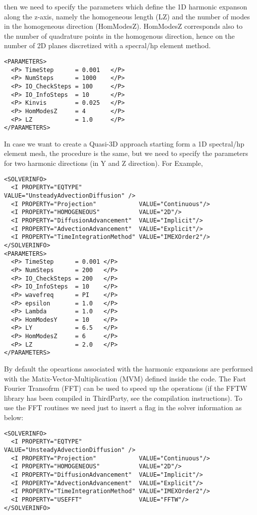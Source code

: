 then we need to specify the parameters which define the 1D harmonic expanson
along the z-axis, namely the homogeneous length (LZ) and the number of modes in
the homogeneous direction (HomModesZ). HomModesZ corresponds also to the number
of quadrature points in the homogenous direction, hence on the number of 2D
planes discretized with a specral/hp element method.

\begin{lstlisting}[style=XMLStyle]
<PARAMETERS>
  <P> TimeStep      = 0.001   </P>
  <P> NumSteps      = 1000    </P>
  <P> IO_CheckSteps = 100     </P>
  <P> IO_InfoSteps  = 10      </P>
  <P> Kinvis        = 0.025   </P>
  <P> HomModesZ     = 4       </P>
  <P> LZ            = 1.0     </P>
</PARAMETERS>
\end{lstlisting}

In case we want to create a Quasi-3D approach starting form a 1D spectral/hp
element mesh, the procedure is the same, but we need to specify the parameters
for two harmonic directions (in Y and Z direction). For Example,

\begin{lstlisting}[style=XMLStyle]
<SOLVERINFO>
  <I PROPERTY="EQTYPE"                VALUE="UnsteadyAdvectionDiffusion" />
  <I PROPERTY="Projection"            VALUE="Continuous"/>
  <I PROPERTY="HOMOGENEOUS"           VALUE="2D"/>
  <I PROPERTY="DiffusionAdvancement"  VALUE="Implicit"/>
  <I PROPERTY="AdvectionAdvancement"  VALUE="Explicit"/>
  <I PROPERTY="TimeIntegrationMethod" VALUE="IMEXOrder2"/>
</SOLVERINFO>
<PARAMETERS>
  <P> TimeStep      = 0.001 </P>
  <P> NumSteps      = 200   </P>
  <P> IO_CheckSteps = 200   </P>
  <P> IO_InfoSteps  = 10    </P>
  <P> wavefreq      = PI    </P>
  <P> epsilon       = 1.0   </P>
  <P> Lambda        = 1.0   </P>
  <P> HomModesY     = 10    </P>
  <P> LY            = 6.5   </P>
  <P> HomModesZ     = 6     </P>
  <P> LZ            = 2.0   </P>
</PARAMETERS>
\end{lstlisting}

By default the opeartions associated with the harmonic expansions are performed
with the Matix-Vector-Multiplication (MVM) defined inside the code. The Fast
Fourier Transofrm (FFT) can be used to speed up the operations (if the FFTW
library has been compiled in ThirdParty, see the compilation instructions). To
use the FFT routines we need just to insert a flag in the solver information as
below:

\begin{lstlisting}[style=XMLStyle]
<SOLVERINFO>
  <I PROPERTY="EQTYPE"                VALUE="UnsteadyAdvectionDiffusion" />
  <I PROPERTY="Projection"            VALUE="Continuous"/>
  <I PROPERTY="HOMOGENEOUS"           VALUE="2D"/>
  <I PROPERTY="DiffusionAdvancement"  VALUE="Implicit"/>
  <I PROPERTY="AdvectionAdvancement"  VALUE="Explicit"/>
  <I PROPERTY="TimeIntegrationMethod" VALUE="IMEXOrder2"/>
  <I PROPERTY="USEFFT"                VALUE="FFTW"/>
</SOLVERINFO>
\end{lstlisting}


